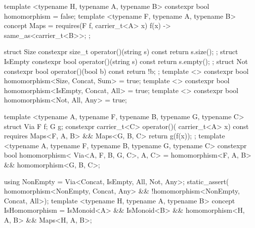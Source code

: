 \begin{listing}[tp]
\begin{minipage}[t]{0.48\linewidth}
\begin{cpp}
template <typename H, typename A,
          typename B>
constexpr bool homomorphism = false;
template <typename F, typename A,
          typename B>
concept Maps = requires(F f,
    carrier_t<A> x) {
  { f(x) } -> same_as<carrier_t<B>>; };
\end{cpp}
\end{minipage}\hspace{0.04\linewidth}%
\begin{minipage}[t]{0.48\linewidth}
\begin{cpp}
struct Size { constexpr size_t
  operator()(string s) const {
    return s.size(); } };
struct IsEmpty { constexpr bool
  operator()(string s) const {
    return s.empty(); } };
struct Not { constexpr bool
  operator()(bool b) const { return !b; } };
template <> constexpr bool
homomorphism<Size, Concat, Sum> = true;
template <> constexpr bool
homomorphism<IsEmpty, Concat, All> = true;
template <> constexpr bool
homomorphism<Not, All, Any> = true;
\end{cpp}
\end{minipage}

\vspace{-7pt}
\begin{minipage}[t]{0.48\linewidth}
\begin{cpp}
template <typename A, typename F,
    typename B, typename G, typename C>
struct Via { F f; G g;
  constexpr carrier_t<C> operator()(
      carrier_t<A> x) const
    requires Maps<F, A, B> &&
             Maps<G, B, C> {
    return g(f(x)); } };
template <typename A, typename F,
    typename B, typename G, typename C>
constexpr bool homomorphism<
    Via<A, F, B, G, C>, A, C> =
  homomorphism<F, A, B> &&
  homomorphism<G, B, C>;
\end{cpp}
\end{minipage}\hspace{0.04\linewidth}%
\begin{minipage}[t]{0.48\linewidth}
\begin{cpp}
using NonEmpty =
    Via<Concat, IsEmpty, All, Not, Any>;
static_assert(
homomorphism<NonEmpty, Concat, Any> &&
!homomorphism<NonEmpty, Concat, All>);
template <typename H, typename A,
          typename B>
concept IsHomomorphism =
  IsMonoid<A> && IsMonoid<B> &&
  homomorphism<H, A, B> &&
  Maps<H, A, B>;
\end{cpp}
\end{minipage}


\end{listing}
